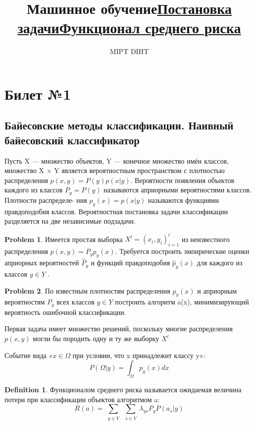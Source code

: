 \documentclass[a4paper]{article}
\title{Машинное обучение}
\author{MIPT DIHT}
\theoremstyle{plain}
\theoremstyle{remark}
\theoremstyle{definition}
\newtheorem{definition}{Definition}
\newtheorem{problem}{Problem}
\newcommand{\bigtitle}[1]{\title{\textbf{\underline{#1}}}}
\begin{document}
\maketitle

\section{Билет №1}
\subsection{Байесовские методы классификации. Наивный байесовский классификатор}
\bigtitle{Постановка задачи}
Пусть X — множество объектов, Y — конечное множество имён классов, множество X × Y является вероятностным пространством с плотностью распределения $p(x, y) = P(y)p(x|y)$. Вероятности появления объектов каждого из классов $P_y = P(y)$ называются априорными вероятностями классов. Плотности распределе-
ния $p_y(x) = p(x|y)$ называются функциями правдоподобия классов. Вероятностная постановка задачи классификации разделяется на две независимые подзадачи. 
\begin{problem}Имеется простая выборка $X^l = (x_i, y_i)_{i=1}^l$ из неизвестного распределения $p(x, y) = P_yp_y(x)$. Требуется построить эмпирические оценки априорных вероятностей $\hat{P}_y$ и функций правдоподобия $\hat{p}_y(x)$ для каждого из классов $y \in Y$ .
\end{problem}
\begin{problem} По известным плотностям распределения $p_y(x)$ и априорным вероятностям $P_y$ всех классов $y \in Y$ построить алгоритм a(x), минимизирующий вероятность ошибочной классификации.
\end{problem}
Первая задача имеет множество решений, поскольку многие распределения $p(x, y)$ могли бы породить одну и ту же выборку $X^l$

\bigtitle{Функционал среднего риска}
Событие вида «$x \in \Omega$ при условии, что x принадлежит классу y»:
$$ P(\Omega|y) = \int_{\Omega} p_y(x) dx $$
\begin{definition} Функционалом среднего риска называется ожидаемая величина потери
при классификации объектов алгоритмом a: $$ R(a) = \sum_{\substack{y \in Y}} \sum_{\substack{s \in Y}} \lambda_{ys} P_y P(a_s|y)$$\end{definition}
\end{document}

